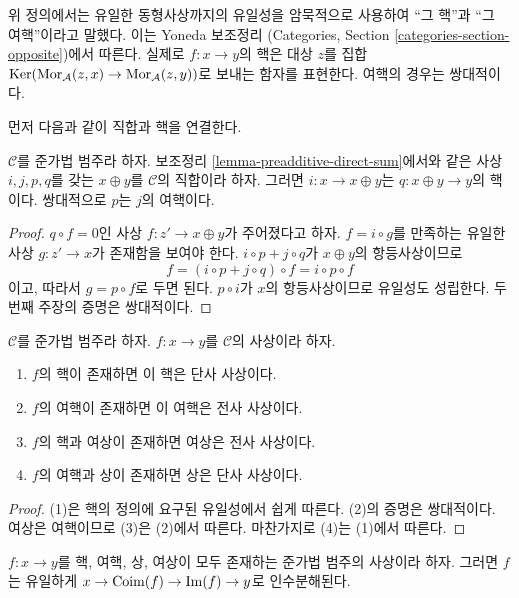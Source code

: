 \noindent
위 정의에서는 유일한 동형사상까지의 유일성을 암묵적으로 사용하여
``그 핵''과 ``그 여핵''이라고 말했다. 이는 Yoneda 보조정리
(Categories, Section \ref{categories-section-opposite})에서 따른다.
실제로 $f : x \to y$의 핵은 대상 $z$를 집합
$\mathop{\mathrm{Ker}}(\mathop{\mathrm{Mor}}\nolimits_\mathcal{A}(z, x) \to \mathop{\mathrm{Mor}}\nolimits_\mathcal{A}(z, y))$로 보내는
함자를 표현한다. 여핵의 경우는 쌍대적이다.

\medskip\noindent
먼저 다음과 같이 직합과 핵을 연결한다.

\begin{lemma}
\label{lemma-additive-cat-biproduct-kernel}
$\mathcal{C}$를 준가법 범주라 하자.
보조정리 \ref{lemma-preadditive-direct-sum}에서와 같은 사상 $i, j, p, q$를
갖는 $x \oplus y$를 $\mathcal{C}$의 직합이라 하자. 그러면
$i : x \to x \oplus y$는 $q : x \oplus y \rightarrow y$의 핵이다.
쌍대적으로 $p$는 $j$의 여핵이다.
\end{lemma}

\begin{proof}
$q \circ f = 0$인 사상 $f : z' \to x \oplus y$가 주어졌다고 하자.
$f = i \circ g$를 만족하는 유일한 사상 $g : z' \to x$가 존재함을
보여야 한다. $i \circ p + j \circ q$가 $x \oplus y$의 항등사상이므로
$$
f = (i \circ p + j \circ q) \circ f = i \circ p \circ f
$$
이고, 따라서 $g = p \circ f$로 두면 된다. $p \circ i$가 $x$의
항등사상이므로 유일성도 성립한다. 두 번째 주장의 증명은 쌍대적이다.
\end{proof}

\begin{lemma}
\label{lemma-kernel-mono}
$\mathcal{C}$를 준가법 범주라 하자.
$f : x \to y$를 $\mathcal{C}$의 사상이라 하자.
\begin{enumerate}
\item $f$의 핵이 존재하면 이 핵은 단사 사상이다.
\item $f$의 여핵이 존재하면 이 여핵은 전사 사상이다.
\item $f$의 핵과 여상이 존재하면 여상은 전사 사상이다.
\item $f$의 여핵과 상이 존재하면 상은 단사 사상이다.
\end{enumerate}
\end{lemma}

\begin{proof}
(1)은 핵의 정의에 요구된 유일성에서 쉽게 따른다. (2)의 증명은 쌍대적이다.
여상은 여핵이므로 (3)은 (2)에서 따른다. 마찬가지로 (4)는 (1)에서 따른다.
\end{proof}

\begin{lemma}
\label{lemma-coim-im-map}
$f : x \to y$를 핵, 여핵, 상, 여상이 모두 존재하는 준가법 범주의
사상이라 하자. 그러면 $f$는 유일하게
$x \to \mathop{\mathrm{Coim}}(f) \to \mathop{\mathrm{Im}}(f) \to y$로 인수분해된다.
\end{lemma}

